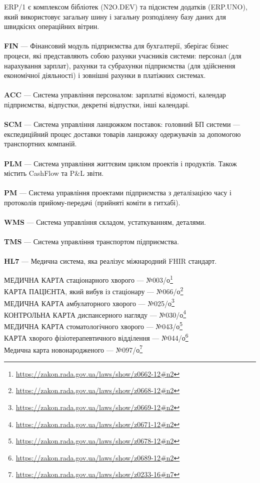 ERP/1 є комплексом бібліотек (N2O.DEV) та підсистем додатків (ERP.UNO),
який використовує загальну шину і загальну розподілену базу даних для швидкіснх операційних вітрин.
\\
\\
\textbf{FIN} — Фінансовий модуль підприємства для бухгалтерії, зберігає бізнес процеси,
        які представляють собою рахунки учасників системи: персонал (для нарахування зарплат),
        рахунки та субрахунки підприємства (для здійснення економічної діяльності) і
        зовнішні рахунки в платіжних системах.
\\
\\
\textbf{ACC} — Система управління персоналом: зарплатні відомості,
        календар підприємства, відпустки, декретні відпустки, інші календарі.
\\
\\
\textbf{SCM} — Система управління ланцюжком поставок: головний БП системи —
           експедиційний процес доставки товарів ланцюжку одержувачів
           за допомогою транспортних компаній.
\\
\\
\textbf{PLM} — Система управління життєвим циклом проектів і продуктів.
           Також містить CashFlow та P\&L звіти.
\\
\\
\textbf{PM} — Система управління проектами підприємства з деталізацією
           часу і протоколів прийому-передачі (прийняті коміти в гитхабі).
\\
\\
\textbf{WMS} — Система управління складом, устаткуванням, деталями.
\\
\\
\textbf{TMS} — Система управління транспортом підприємства.
\\
\\
\textbf{HL7} — Медична система, яка реалізує міжнародний FHIR стандарт.

\noindent МЕДИЧНА КАРТА стаціонарного хворого --- №003/о\footnote{\url{https://zakon.rada.gov.ua/laws/show/z0662-12#n2}}\\
КАРТА ПАЦІЄНТА, який вибув із стаціонару --- №066/о\footnote{\url{https://zakon.rada.gov.ua/laws/show/z0668-12#n2}}\\
МЕДИЧНА КАРТА амбулаторного хворого --- №025/о\footnote{\url{https://zakon.rada.gov.ua/laws/show/z0669-12#n2}}\\
КОНТРОЛЬНА КАРТА диспансерного нагляду --- №030/о\footnote{\url{https://zakon.rada.gov.ua/laws/show/z0671-12#n2}}\\
МЕДИЧНА КАРТА стоматологічного хворого --- №043/о\footnote{\url{https://zakon.rada.gov.ua/laws/show/z0678-12#n2}}\\
КАРТА хворого фізіотерапевтичного відділення --- №044/о\footnote{\url{https://zakon.rada.gov.ua/laws/show/z0689-12#n2}}\\
Медична карта новонародженого --- №097/о\footnote{\url{https://zakon.rada.gov.ua/laws/show/z0233-16#n7}}\\

